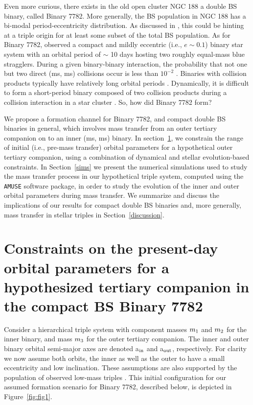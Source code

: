 \documentclass{aastex62}
\begin{document}
Even more curious, there exists in the old open cluster NGC 188 a
double BS binary, called Binary 7782.  More generally, the BS
population in NGC 188 has a bi-modal period-eccentricity distribution.
As discussed in \citet{leigh11}, this could be hinting at a triple
origin for at least some subset of the total BS population.  As for
Binary 7782, \citet{mathieu09} observed a compact and mildly eccentric
(i.e., $e \sim 0.1$) binary star system with an orbital period of
$\sim$ 10 days hosting two roughly equal-mass blue stragglers.  During
a given binary-binary interaction, the probability that not one but
two direct (ms, ms) collisions occur is less than $10^{-2}$
\citep{leonard89,leigh11,leigh12}.  Binaries with collision products
typically have relatively long orbital periods
\cite{2011Sci...334.1380F}. Dynamically, it is difficult to form a
short-period binary composed of two collision products during a
collision interaction in a star cluster \citep{2011Sci...334.1380F}.
So, how did Binary 7782 form?

We propose a formation channel for Binary 7782, and compact double BS
binaries in general, which involves mass transfer from an outer
tertiary companion on to an inner (ms, ms) binary.  In
section~\ref{sect:dyn}, we constrain the range of initial (i.e., pre-mass
transfer) orbital parameters for a hypothetical outer tertiary
companion, using a combination of dynamical and stellar
evolution-based constraints.  In Section~\ref{sims} we present the
numerical simulations used to study the mass transfer process in our
hypothetical triple system, computed using the
\texttt{AMUSE}\cite{AMUSE} software package, in order to study the
evolution of the inner and outer orbital parameters during mass
transfer.  We summarize and discuss the implications of our results
for compact double BS binaries and, more generally, mass transfer in
stellar triples in Section~\ref{discussion}.

\section{Constraints on the present-day orbital parameters for a hypothesized
         tertiary companion in the compact BS Binary 7782} \label{sect:dyn}

Consider a hierarchical triple system with component masses $m_{\rm
  1}$ and $m_{\rm 2}$ for the inner binary, and mass $m_{\rm 3}$ for
the outer tertiary companion.  The inner and outer binary orbital
semi-major axes are denoted a$_{\rm in}$ and a$_{\rm out}$,
respectively.  For clarity we now assume both orbits, the inner as
well as the outer to have a small eccentricity and low inclination.
These assumptions are also supported by the population of observed
low-mass triples \cite{2010yCat..73890925T,moe18}.  This initial
configuration for our assumed formation scenario for Binary 7782,
described below, is depicted in Figure~\ref{fig:fig1}.
\end{document}
